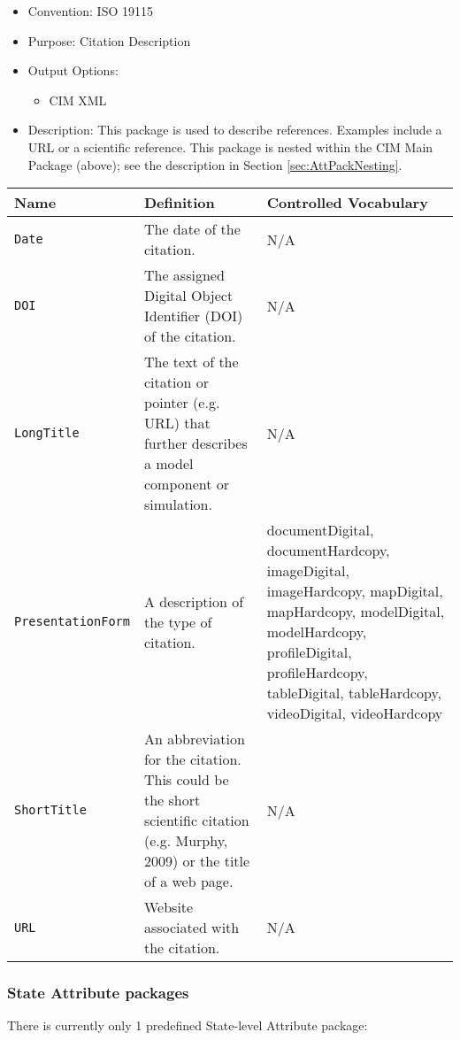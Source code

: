 \begin{itemize}
    \item Convention: ISO 19115
    \item Purpose: Citation Description
    \item Output Options: 
    \begin{itemize}
        \item CIM XML 
    \end{itemize} 
    \item Description: This package is used to describe references. Examples include a URL or a scientific reference.  This package is nested within the CIM Main Package (above); see the description in Section \ref{sec:AttPackNesting}.
\end{itemize}


\begin{tabular}{|p{5cm}|p{7cm}|p{5cm}|}
     {\bf Name } & {\bf Definition} & {\bf Controlled Vocabulary} \\
     \hline\hline
     {\tt Date} & The date of the citation. & N/A\\
     {\tt DOI} & The assigned Digital Object Identifier (DOI) of the citation. & N/A\\
     {\tt LongTitle} & The text of the citation or pointer (e.g. URL) that further describes a model component or simulation. & N/A\\
     {\tt PresentationForm} & A description of the type of citation. & documentDigital, documentHardcopy, imageDigital, imageHardcopy, mapDigital, mapHardcopy, modelDigital, modelHardcopy, profileDigital, profileHardcopy, tableDigital, tableHardcopy, videoDigital, videoHardcopy\\
     {\tt ShortTitle} & An abbreviation for the citation.  This could be the short scientific citation (e.g. Murphy, 2009) or the title of a web page. & N/A \\     {\tt URL} & Website associated with the citation. & N/A\\
\end{tabular}



\vspace{.20in}
\subsubsection{State Attribute packages}
\label{StateAttributePackages}

There is currently only 1 predefined State-level Attribute package:

